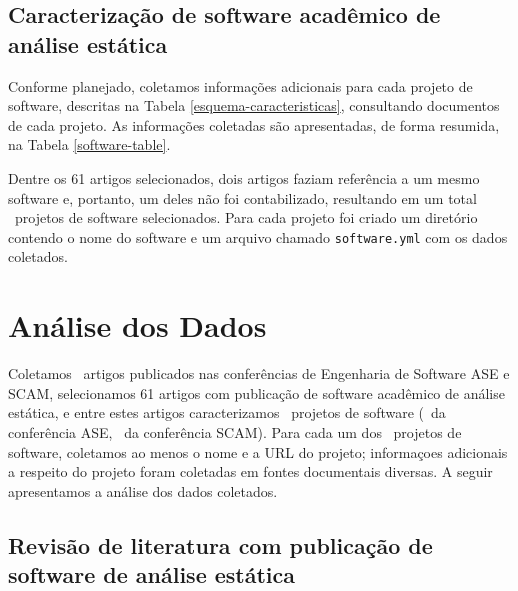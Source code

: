 \subsection{Caracterização de software acadêmico de análise estática}

Conforme planejado, coletamos informações adicionais 
para cada projeto de software, descritas na Tabela
\ref{esquema-caracteristicas}, consultando
documentos de cada projeto. As informações coletadas são apresentadas, de forma
resumida, na Tabela \ref{software-table}.



Dentre os 61 artigos selecionados, dois artigos faziam referência a um mesmo software e,
portanto, um deles não foi contabilizado, 
resultando em um total \SoftwareCount \ projetos de software selecionados. Para cada projeto foi criado um
diretório contendo o nome do software e um arquivo chamado
\texttt{software.yml} com os dados coletados.


\section{Análise dos Dados} \label{estudo1:analise} %

Coletamos \PapersCount \ artigos publicados nas conferências de Engenharia de Software
ASE e SCAM, selecionamos 61 artigos com publicação de software acadêmico de
análise estática, e entre estes artigos caracterizamos \SoftwareCount \ projetos de software
(\SoftwareASECount \ da conferência ASE, \SoftwareSCAMCount \ da conferência SCAM).
Para cada um dos \SoftwareCount \ projetos de software, coletamos ao menos o nome e a URL do projeto;
informaçoes adicionais a respeito do projeto foram coletadas em fontes documentais diversas.
A seguir apresentamos a análise dos dados coletados.

\subsection{Revisão de literatura com publicação de software de análise estática}

